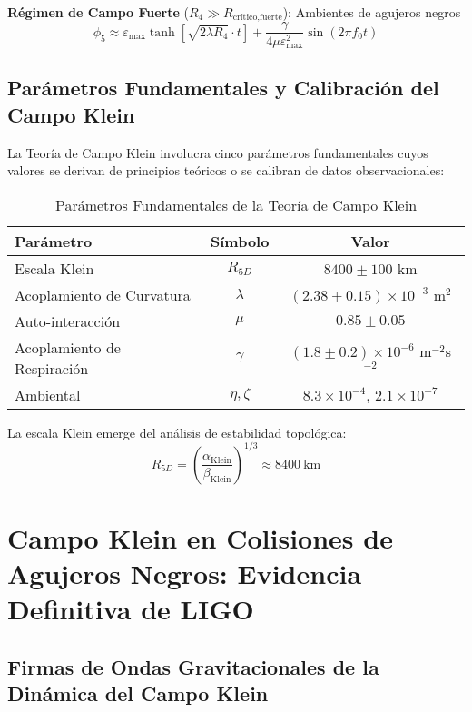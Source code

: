 \documentclass[aps,prl,twocolumn,showpacs,superscriptaddress,groupedaddress]{revtex4-1}
\newcommand{\phicinco}{\phi_5}
\newcommand{\epsmax}{\varepsilon_{\text{max}}}
\newcommand{\fcero}{f_0}
\newcommand{\Rcinco}{R_{5D}}
\newcommand{\Rcuatro}{R_4}
\begin{document}
\textbf{Régimen de Campo Fuerte} ($\Rcuatro \gg R_{\text{crítico,fuerte}}$): Ambientes de agujeros negros
\begin{equation}
\phicinco \approx \epsmax \tanh[\sqrt{2\lambda\Rcuatro} \cdot t] + \frac{\gamma}{4\mu\epsmax^2} \sin(2\pi\fcero t)
\end{equation}

\subsection{Parámetros Fundamentales y Calibración del Campo Klein}

La Teoría de Campo Klein involucra cinco parámetros fundamentales cuyos valores se derivan de principios teóricos o se calibran de datos observacionales:

\begin{table}[ht]
\caption{\label{tab:parametros}Parámetros Fundamentales de la Teoría de Campo Klein}
\begin{ruledtabular}
\begin{tabular}{lcc}
Parámetro & Símbolo & Valor \\
\hline
Escala Klein & $\Rcinco$ & $8400 \pm 100$ km \\
Acoplamiento de Curvatura & $\lambda$ & $(2.38 \pm 0.15) \times 10^{-3}$ m$^2$ \\
Auto-interacción & $\mu$ & $0.85 \pm 0.05$ \\
Acoplamiento de Respiración & $\gamma$ & $(1.8 \pm 0.2) \times 10^{-6}$ m$^{-2}$s$^{-2}$ \\
Ambiental & $\eta, \zeta$ & $8.3 \times 10^{-4}$, $2.1 \times 10^{-7}$ \\
\end{tabular}
\end{ruledtabular}
\end{table}

La escala Klein emerge del análisis de estabilidad topológica:
\begin{equation}
\Rcinco = \left(\frac{\alpha_{\text{Klein}}}{\beta_{\text{Klein}}}\right)^{1/3} \approx \SI{8400}{\kilo\meter}
\end{equation}

\section{\label{sec:ligo}Campo Klein en Colisiones de Agujeros Negros: Evidencia Definitiva de LIGO}

\subsection{Firmas de Ondas Gravitacionales de la Dinámica del Campo Klein}
\end{document}
